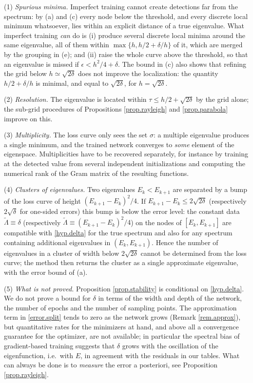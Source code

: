 \begin{remark}[Interpretation]\label{rem.stability}
(1) \emph{Spurious minima.} Imperfect training cannot create detections far from the
spectrum: by (a) and (c) every node below the threshold, and every discrete local minimum
whatsoever, lies within an explicit distance of a true eigenvalue. What imperfect
training \emph{can} do is (i) produce several discrete local minima around the same
eigenvalue, all of them within $\max\{h,h/2+\delta/h\}$ of it, which are merged by the
grouping in (e); and (ii) raise the whole curve above the threshold, so that an
eigenvalue is missed if $\epsilon<h^2/4+\delta$. The bound in (c) also shows that refining
the grid below $h\simeq\sqrt{2\delta}$ does not improve the localization: the quantity
$h/2+\delta/h$ is minimal, and equal to $\sqrt{2\delta}$, for $h=\sqrt{2\delta}$.

(2) \emph{Resolution.} The eigenvalue is located within $\tau\le h/2+\sqrt{2\delta}$ by the
grid alone; the sub-grid procedures of Propositions \ref{prop.rayleigh} and
\ref{prop.parabola} improve on this.

(3) \emph{Multiplicity.} The loss curve only sees the set $\sigma$: a multiple eigenvalue
produces a single minimum, and the trained network converges to \emph{some} element of
the eigenspace. Multiplicities have to be recovered separately, for instance by training
at the detected value from several independent initializations and computing the
numerical rank of the Gram matrix of the resulting functions.

(4) \emph{Clusters of eigenvalues.} Two eigenvalues $E_k<E_{k+1}$ are separated by a bump
of the loss curve of height $(E_{k+1}-E_k)^2/4$. If $E_{k+1}-E_k\le2\sqrt{2\delta}$
(respectively $2\sqrt\delta$ for one-sided errors) this bump is below the error level:
the constant data $\tilde\Lambda\equiv\delta$ (respectively
$\tilde\Lambda\equiv(E_{k+1}-E_k)^2/4$) on the nodes of $[E_k,E_{k+1}]$ are compatible
with \eqref{hyp.delta} for the true spectrum and also for any spectrum containing
additional eigenvalues in $(E_k,E_{k+1})$. Hence the number of eigenvalues in a cluster
of width below $2\sqrt{2\delta}$ cannot be determined from the loss curve; the method then
returns the cluster as a single approximate eigenvalue, with the error bound of (a).

(5) \emph{What is not proved.} Proposition \ref{prop.stability} is conditional on
\eqref{hyp.delta}. We do not prove a bound for $\delta$ in terms of the width and depth of
the network, the number of epochs and the number of sampling points. The approximation
term in \eqref{error.split} tends to zero as the network grows (Remark
\ref{rem.approx}), but quantitative rates for the minimizers at hand, and above all a
convergence guarantee for the optimizer, are not available; in particular the spectral
bias of gradient-based training \cite{Rahaman-etal} suggests that $\delta$ grows with the
oscillation of the eigenfunction, i.e.\ with $E$, in agreement with the residuals in our
tables. What can always be done is to \emph{measure} the error a posteriori, see
Proposition \ref{prop.rayleigh}.
\end{remark}

